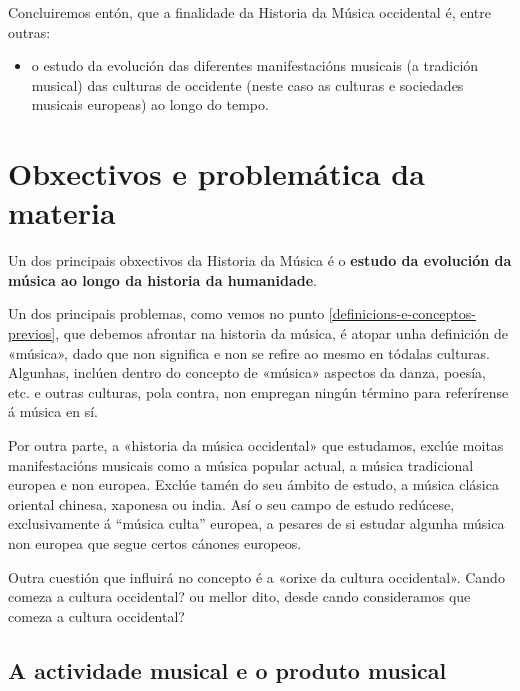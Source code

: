\documentclass[a4paper, twoside]{templates/ociamthesis}
\providecommand{\tightlist}{%
  \setlength{\itemsep}{0pt}\setlength{\parskip}{0pt}}
\begin{document}
Concluiremos entón, que a finalidade da Historia da Música occidental é, entre outras:

\begin{correction}
\begin{itemize}
\tightlist
\item
  o estudo da evolución das diferentes manifestacións musicais (a
  tradición musical) das culturas de occidente (neste caso as culturas e
  sociedades musicais europeas) ao longo do tempo.
\end{itemize}
\end{correction}

\hypertarget{obxectivos-e-problemuxe1tica-da-materia}{%
\section*{Obxectivos e problemática da materia}\label{obxectivos-e-problemuxe1tica-da-materia}}

Un dos principais obxectivos da Historia da Música é o \textbf{estudo da evolución da música ao longo da historia da humanidade}.

Un dos principais problemas, como vemos no punto \ref{definicions-e-conceptos-previos}, que debemos afrontar na historia da música, é atopar unha definición de «música», dado que non significa e non se refire ao mesmo en tódalas culturas. Algunhas, inclúen dentro do concepto de «música» aspectos da danza, poesía, etc. e outras culturas, pola contra, non empregan ningún término para referírense á música en sí.

Por outra parte, a «historia da música occidental» que estudamos, exclúe moitas manifestacións musicais como a música popular actual, a música tradicional europea e non europea. Exclúe tamén do seu ámbito de estudo, a música clásica oriental chinesa, xaponesa ou india. Así o seu campo de estudo redúcese, exclusivamente á ``música culta'' europea, a pesares de si estudar algunha música non europea que segue certos cánones europeos.

Outra cuestión que influirá no concepto é a «orixe da cultura occidental». Cando comeza a cultura occidental? ou mellor dito, desde cando consideramos que comeza a cultura occidental?

\hypertarget{a-actividade-musical-e-o-produto-musical}{%
\subsection*{A actividade musical e o produto musical}\label{a-actividade-musical-e-o-produto-musical}}
\end{document}
